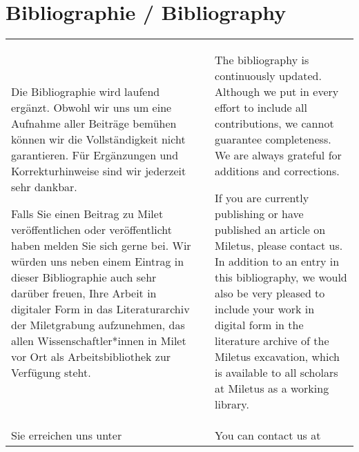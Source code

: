 
\chapter{Bibliographie / Bibliography}

\begin{tabular}[H!]{p{} c p{}}
    

Die Bibliographie wird laufend ergänzt. Obwohl wir uns um eine Aufnahme aller Beiträge bemühen können wir die Vollständigkeit nicht garantieren. Für Ergänzungen und Korrekturhinweise sind wir jederzeit sehr dankbar. 

Falls Sie einen Beitrag zu Milet veröffentlichen oder veröffentlicht haben melden Sie sich gerne bei. Wir würden uns neben einem Eintrag in dieser Bibliographie auch sehr darüber freuen, Ihre Arbeit in digitaler Form in das Literaturarchiv der Miletgrabung aufzunehmen, das allen Wissenschaftler*innen in Milet vor Ort als Arbeitsbibliothek zur Verfügung steht. 

&  &

The bibliography is continuously updated. Although we put in every effort to include all contributions, we cannot guarantee completeness. We are always grateful for additions and corrections. 

If you are currently publishing or have published an article on Miletus, please contact us. In addition to an entry in this bibliography, we would also be very pleased to include your work in digital form in the literature archive of the Miletus excavation, which is available to all scholars at Miletus as a working library.\\

Sie erreichen uns unter & & You can contact us at\\
\end{tabular}

\begin{center}%
\end{center}%